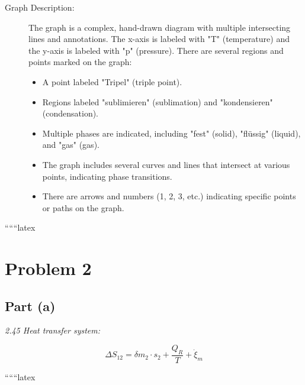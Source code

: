\begin{description}
    \item[Graph Description:] The graph is a complex, hand-drawn diagram with multiple intersecting lines and annotations. The x-axis is labeled with "T" (temperature) and the y-axis is labeled with "p" (pressure). There are several regions and points marked on the graph:
    \begin{itemize}
        \item A point labeled "Tripel" (triple point).
        \item Regions labeled "sublimieren" (sublimation) and "kondensieren" (condensation).
        \item Multiple phases are indicated, including "fest" (solid), "flüssig" (liquid), and "gas" (gas).
        \item The graph includes several curves and lines that intersect at various points, indicating phase transitions.
        \item There are arrows and numbers (1, 2, 3, etc.) indicating specific points or paths on the graph.
    \end{itemize}
\end{description}

``````latex


\section*{Problem 2}

\subsection*{Part (a)}

\textit{2.45 Heat transfer system:}

\[
\Delta S_{12} = \delta m_2 \cdot s_2 + \frac{Q_R}{T} + \dot{\xi}_m
\]

``````latex


